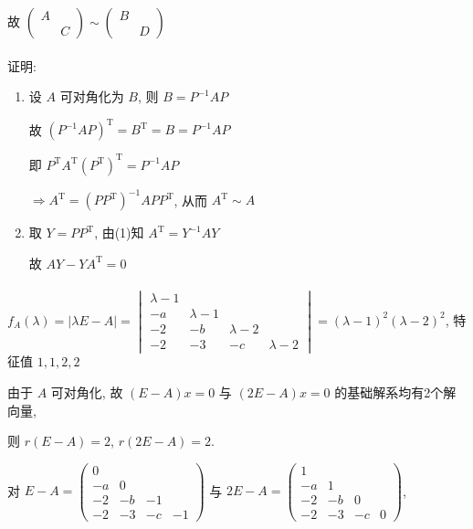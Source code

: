 		 故 \( \begin{pmatrix}
			 A &   \\
			   & C
		 \end{pmatrix} \sim \begin{pmatrix}
			 B &   \\
			   & D
		 \end{pmatrix} \)


	 \paragraph{} %
		 证明:
		 \begin{enumerate}
			 \item %
			       设 \( A \) 可对角化为 \( B \), 则 \( B = P^{-1}AP \)

			       故 \( (P^{-1}AP)^{\mathrm{T}} = B^{\mathrm{T}} = B = P^{-1}AP \)

			       即 \( P^{\mathrm{T}}A^{\mathrm{T}}(P^{\mathrm{T}})^{\mathrm{T}} = P^{-1}AP \)

			       \( \Rightarrow A^{\mathrm{T}} = (PP^{\mathrm{T}})^{-1}APP^{\mathrm{T}} \), 从而 \( A^{\mathrm{T}} \sim A \)
			 \item %
			       取 \( Y = PP^{\mathrm{T}} \), 由(1)知 \( A^{\mathrm{T}} = Y^{-1}AY \)

			       故 \( AY - YA^{\mathrm{T}} = 0 \)
		 \end{enumerate}


	 \paragraph{} %
		 \( f_{A}(\lambda) = |\lambda E - A| = \begin{vmatrix}
			 \lambda - 1 &             &             &           \\
			 -a          & \lambda - 1 &             &           \\
			 -2          & -b          & \lambda - 2 &           \\
			 -2          & -3          & -c          & \lambda-2
		 \end{vmatrix} = (\lambda - 1)^{2}(\lambda - 2)^{2} \), 特征值 \( 1, 1, 2, 2 \)

		 由于 \( A \) 可对角化, 故 \( (E - A)x = 0 \) 与 \( (2E - A)x = 0 \) 的基础解系均有2个解向量,

		 则 \( r(E - A) = 2 \), \( r(2E - A) = 2 \).

		 对 \( E - A = \begin{pmatrix}
			 0  &    &    &    \\
			 -a & 0  &    &    \\
			 -2 & -b & -1 &    \\
			 -2 & -3 & -c & -1
		 \end{pmatrix} \) 与 \( 2E - A = \begin{pmatrix}
			 1  &    &    &   \\
			 -a & 1  &    &   \\
			 -2 & -b & 0  &   \\
			 -2 & -3 & -c & 0
		 \end{pmatrix} \),


